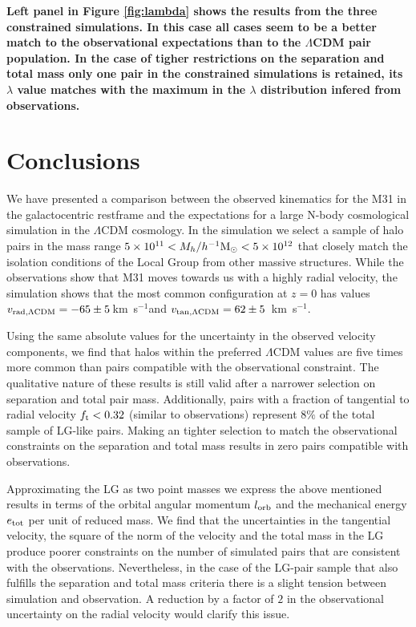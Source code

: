 \documentclass{emulateapj}
\newcommand{\kms}{\,km~s$^{-1}$}
\newcommand{\hMsun}{{\ifmmode{h^{-1}{\rm {M_{\odot}}}}\else{$h^{-1}{\rm{M_{\odot}}}$}\fi}}
\begin{document}
{\bf Left panel in Figure \ref{fig:lambda} shows the results from the three constrained simulations. In this case all cases seem to be a better match to the observational expectations than to the $\Lambda$CDM pair population. In the case of tigher restrictions on the separation and total mass only one pair in the constrained simulations is retained, its $\lambda$ value matches with the maximum in the $\lambda$ distribution infered from observations.}


\section{Conclusions}
We have presented a comparison between the observed kinematics for the M31 in the galactocentric restframe and the expectations for a large N-body cosmological simulation in the $\Lambda$CDM cosmology. In the simulation we select a sample of halo pairs in the mass range $5\times 10^{11}<M_{h}/\hMsun<5\times 10^{12}$ that closely match the isolation conditions of the Local Group from other massive structures. While the observations show that M31 moves towards us with a highly radial velocity, the simulation shows that the most common configuration at $z=0$ has values $v_{\rm rad, \Lambda CDM}=-65\pm5$\kms and $v_{\rm tan, \Lambda CDM}=62\pm5$ \kms. 


Using the same absolute values for the uncertainty in the observed velocity components, we find that halos within the preferred $\Lambda$CDM values are five times more common than pairs compatible with the observational constraint.  The qualitative nature of these results is still valid after a narrower selection on separation and total pair mass. Additionally, pairs with a fraction of tangential to radial velocity $f_{\rm t}<0.32$ (similar to observations) represent $8\%$ of the total sample of LG-like pairs. Making an tighter selection to match the observational constraints on the separation and total mass results in zero pairs compatible with observations.

Approximating the LG as two point masses we express the above mentioned results in terms of the orbital angular momentum $l_{\rm orb}$ and the mechanical energy $e_{\rm tot}$ per unit of reduced mass. We find that the uncertainties in the tangential velocity, the square of the norm of the velocity and the total mass in the LG produce poorer constraints on the number of simulated pairs that are consistent with the observations. Nevertheless, in the case of the LG-pair sample that also fulfills the separation and total mass criteria there is a slight tension between simulation and observation. A reduction by a factor of $2$ in the observational uncertainty on the radial velocity would clarify this issue.
\end{document}
